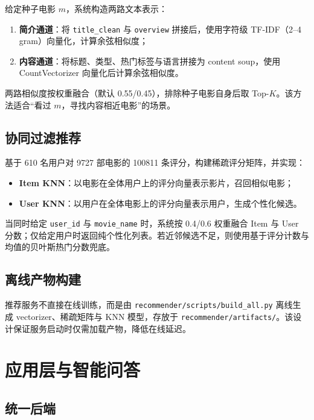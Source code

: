 给定种子电影 $m$，系统构造两路文本表示：

\begin{enumerate}
    \item \textbf{简介通道}：将 \texttt{title\_clean} 与 \texttt{overview} 拼接后，使用字符级 TF-IDF（2--4 gram）向量化，计算余弦相似度；
    \item \textbf{内容通道}：将标题、类型、热门标签与语言拼接为 content soup，使用 CountVectorizer 向量化后计算余弦相似度。
\end{enumerate}

两路相似度按权重融合（默认 0.55/0.45），排除种子电影自身后取 Top-$K$。该方法适合“看过 $m$，寻找内容相近电影”的场景。

\subsection{协同过滤推荐}

基于 610 名用户对 9727 部电影的 100811 条评分，构建稀疏评分矩阵，并实现：

\begin{itemize}
    \item \textbf{Item KNN}：以电影在全体用户上的评分向量表示影片，召回相似电影；
    \item \textbf{User KNN}：以用户在全体电影上的评分向量表示用户，生成个性化候选。
\end{itemize}

当同时给定 \texttt{user\_id} 与 \texttt{movie\_name} 时，系统按 0.4/0.6 权重融合 Item 与 User 分数；仅给定用户时返回纯个性化列表。若近邻候选不足，则使用基于评分计数与均值的贝叶斯热门分数兜底。

\subsection{离线产物构建}

推荐服务不直接在线训练，而是由 \texttt{recommender/scripts/build\_all.py} 离线生成 vectorizer、稀疏矩阵与 KNN 模型，存放于 \texttt{recommender/artifacts/}。该设计保证服务启动时仅需加载产物，降低在线延迟。

\section{应用层与智能问答}
\label{sec:method:application}

\subsection{统一后端}

